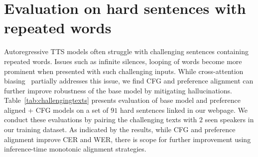 
\section{Evaluation on hard sentences with repeated words}
Autoregressive TTS models often struggle with challenging sentences containing repeated words. Issues such as infinite silences, looping of words become more prominent when presented with such challenging inputs. While cross-attention biasing~\cite{onealign,t5tts} partially addresses this issue, we find CFG and preference alignment can further improve robustness of the base model by mitigating hallucinations. 
Table~\ref{tab:challengingtexts} presents evaluation of base model and preference aligned + CFG models on a set of $91$ hard sentences linked in our webpage. We conduct these evaluations by pairing the challenging texts with $2$ seen speakers in our training dataset. As indicated by the results, while CFG and preference alignment improve CER and WER, there is scope for further improvement using inference-time monotonic alignment strategies.

